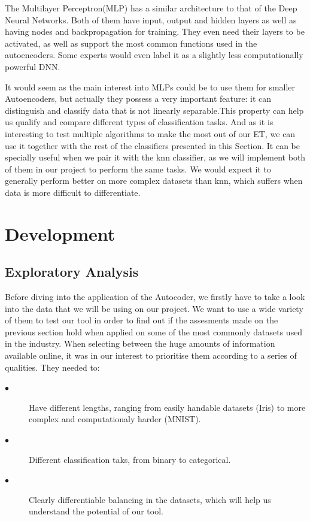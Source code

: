 \documentclass[12pt]{report}
\begin{document}
The Multilayer Perceptron(MLP) has a similar architecture to that of the Deep Neural Networks. Both of them have input, output and hidden layers as well as having nodes and backpropagation for training. They even need their layers to be activated, as well as support the most common functions used in the autoencoders. Some experts would even label it as a slightly less computationally powerful DNN. \par

It would seem as the main interest into MLPs could be to use them for smaller Autoencoders, but actually they possess a very important feature: it can distinguish and classify data that is not linearly separable.This property can help us qualify and compare different types of classification tasks. And as it is interesting to test multiple algorithms to make the most out of our ET, we can use it together with the rest of the classifiers presented in this Section. It can be specially useful when we pair it with the knn classifier, as we will implement both of them in our project to perform the same tasks. We would expect it to generally perform better on more complex datasets than knn, which suffers when data is more difficult to differentiate. \par

\chapter{Development}
\section{Exploratory Analysis}

Before diving into the application of the Autocoder, we firstly have to take a look into the data that we will be using on our project. We want to use a wide variety of them to test our tool in order to find out if the assesments made on the previous section hold when applied on some of the most commonly datasets used in the industry. When selecting between the huge amounts of information available online, it was in our interest to prioritise them according to a series of qualities. They needed to:
 
\begin{description}
	
\item[$\bullet$] Have different lengths, ranging from easily handable datasets (Iris) to more complex and computationaly harder (MNIST).

\item[$\bullet$] Different classification taks, from binary to categorical.

\item[$\bullet$] Clearly differentiable balancing in the datasets, which will help us understand the potential of our tool.

\end{description}
\end{document}
